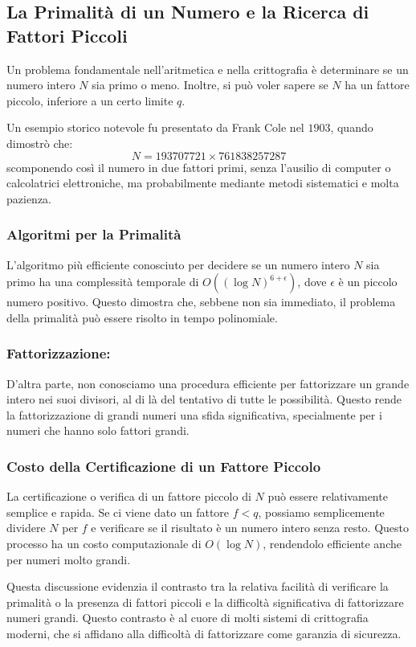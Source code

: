\subsection{La Primalità di un Numero e la Ricerca di Fattori Piccoli}
Un problema fondamentale nell'aritmetica e nella crittografia è determinare se un numero
intero $N$ sia primo o meno. Inoltre, si può voler sapere se $N$ ha un fattore piccolo,
inferiore a un certo limite $q$. 

Un esempio storico notevole fu presentato da Frank Cole nel $1903$, quando dimostrò che:
\[N = 193707721 \times 761838257287\]
scomponendo così il numero in due fattori primi, senza l'ausilio di computer o calcolatrici elettroniche, ma probabilmente mediante metodi sistematici e molta pazienza.

\subsubsection{Algoritmi per la Primalità}
L'algoritmo più efficiente conosciuto per decidere se un numero intero $N$ sia
primo ha una complessità temporale di $O((\log N)^{6+\epsilon})$, dove $\epsilon$ è
un piccolo numero positivo. Questo dimostra che, sebbene non sia immediato, il problema
della primalità può essere risolto in tempo polinomiale.

\subsubsection{Fattorizzazione:} 
D'altra parte, non conosciamo una procedura efficiente per
fattorizzare un grande intero nei suoi divisori, al di là del tentativo di tutte le
possibilità. Questo rende la fattorizzazione di grandi numeri una sfida significativa,
specialmente per i numeri che hanno solo fattori grandi.

\subsubsection{Costo della Certificazione di un Fattore Piccolo}
La certificazione o verifica di un fattore piccolo di $N$ può essere relativamente
semplice e rapida. Se ci viene dato un fattore $f < q$, possiamo semplicemente
dividere $N$ per $f$ e verificare se il risultato è un numero intero senza resto.
Questo processo ha un costo computazionale di $O(\log N)$, rendendolo efficiente
anche per numeri molto grandi.

Questa discussione evidenzia il contrasto tra la relativa facilità di verificare
la primalità o la presenza di fattori piccoli e la difficoltà significativa di
fattorizzare numeri grandi. Questo contrasto è al cuore di molti sistemi di
crittografia moderni, che si affidano alla difficoltà di fattorizzare come
garanzia di sicurezza.

